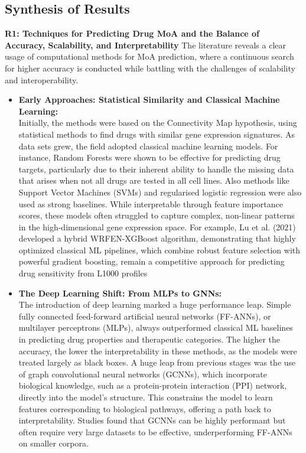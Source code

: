 \documentclass[twocolumn,12pt,a4paper]{article}
\begin{document}
\subsection{Synthesis of Results}
\textbf{R1: Techniques for Predicting Drug MoA and the Balance of Accuracy, Scalability, and Interpretability}
The literature reveals a clear usage of computational methods for MoA prediction, where a continuous search for higher accuracy is conducted while battling with the challenges of scalability and interoperability.
    \begin{itemize}
        \item \textbf{Early Approaches: Statistical Similarity and Classical Machine Learning:}
        \\
        Initially, the methods were based on the Connectivity Map hypothesis, using statistical methods to find drugs with similar gene expression signatures\cite{subramanian2017next,el2017integrative,liao2023open}. As data sets grew, the field adopted classical machine learning models. For instance, Random Forests were shown to be effective for predicting drug targets, particularly due to their inherent ability to handle the missing data that arises when not all drugs are tested in all cell lines\cite{mcdermott2019deep,subramanian2017next,duan2016l1000cds2}. Also methods like Support Vector Machines (SVMs) and regularised logistic regression were also used as strong baselines. While interpretable through feature importance scores, these models often struggled to capture complex, non-linear patterns in the high-dimensional gene expression space\cite{mcdermott2019deep}. For example, Lu et al. (2021) developed a hybrid WRFEN-XGBoost algorithm, demonstrating that highly optimized classical ML pipelines, which combine robust feature selection with powerful gradient boosting, remain a competitive approach for predicting drug sensitivity from L1000 profiles\cite{lu2021drug}
        \item \textbf{The Deep Learning Shift: From MLPs to GNNs:}
        \\
        The introduction of deep learning marked a huge performance leap. Simple fully connected feed-forward artificial neural networks (FF-ANNs), or multilayer perceptrons (MLPs), always outperformed classical ML baselines in predicting drug properties and therapeutic categories\cite{mcdermott2019deep}. The higher the accuracy, the lower the interpretability in these methods, as the models were treated largely as black boxes\cite{samal2022opportunities}. A huge leap from previous stages was the use of graph convolutional neural networks (GCNNs), which incorporate biological knowledge, such as a protein-protein interaction (PPI) network, directly into the model's structure. This constrains the model to learn features corresponding to biological pathways, offering a path back to interpretability.  Studies found that GCNNs can be highly performant but often require very large datasets to be effective, underperforming FF-ANNs on smaller corpora\cite{mcdermott2019deep}.
    

\end{itemize}
\end{document}
